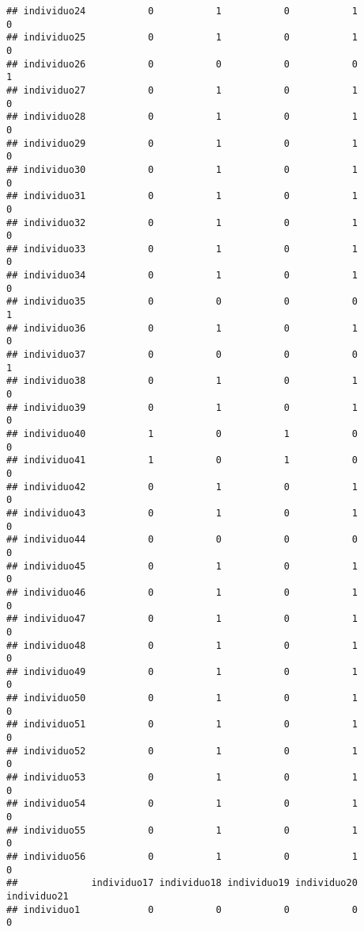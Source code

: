 \documentclass[
]{article}
\begin{document}
\begin{verbatim}
## individuo24           0           1           0           1           0
## individuo25           0           1           0           1           0
## individuo26           0           0           0           0           1
## individuo27           0           1           0           1           0
## individuo28           0           1           0           1           0
## individuo29           0           1           0           1           0
## individuo30           0           1           0           1           0
## individuo31           0           1           0           1           0
## individuo32           0           1           0           1           0
## individuo33           0           1           0           1           0
## individuo34           0           1           0           1           0
## individuo35           0           0           0           0           1
## individuo36           0           1           0           1           0
## individuo37           0           0           0           0           1
## individuo38           0           1           0           1           0
## individuo39           0           1           0           1           0
## individuo40           1           0           1           0           0
## individuo41           1           0           1           0           0
## individuo42           0           1           0           1           0
## individuo43           0           1           0           1           0
## individuo44           0           0           0           0           0
## individuo45           0           1           0           1           0
## individuo46           0           1           0           1           0
## individuo47           0           1           0           1           0
## individuo48           0           1           0           1           0
## individuo49           0           1           0           1           0
## individuo50           0           1           0           1           0
## individuo51           0           1           0           1           0
## individuo52           0           1           0           1           0
## individuo53           0           1           0           1           0
## individuo54           0           1           0           1           0
## individuo55           0           1           0           1           0
## individuo56           0           1           0           1           0
##             individuo17 individuo18 individuo19 individuo20 individuo21
## individuo1            0           0           0           0           0

\end{verbatim}
\end{document}
